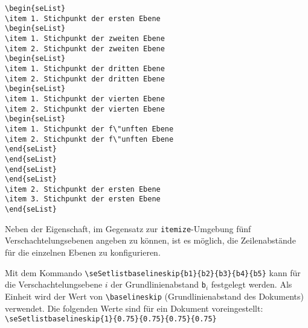 \vspace*{-\baselineskip}
\begin{verbatim}
\begin{seList}
\item 1. Stichpunkt der ersten Ebene
\begin{seList}
\item 1. Stichpunkt der zweiten Ebene
\item 2. Stichpunkt der zweiten Ebene
\begin{seList}
\item 1. Stichpunkt der dritten Ebene
\item 2. Stichpunkt der dritten Ebene
\begin{seList}
\item 1. Stichpunkt der vierten Ebene
\item 2. Stichpunkt der vierten Ebene
\begin{seList}
\item 1. Stichpunkt der f\"unften Ebene
\item 2. Stichpunkt der f\"unften Ebene
\end{seList}
\end{seList}
\end{seList}
\end{seList}
\item 2. Stichpunkt der ersten Ebene
\item 3. Stichpunkt der ersten Ebene
\end{seList}
\end{verbatim}

\vspace*{-\baselineskip}
Neben der Eigenschaft, im Gegensatz zur \verb+itemize+-Umgebung f\"unf Verschachtelungsebenen angeben zu k\"onnen, ist es m\"oglich,
die Zeilenabst\"ande f\"ur die einzelnen Ebenen zu konfigurieren. 

Mit dem Kommando \newline 
\hspace*{\fill}\verb+\seSetlistbaselineskip{b1}{b2}{b3}{b4}{b5}+\hspace*{\fill}\newline 
kann f\"ur die Verschachtelungsebene $i$ der Grundlinienabstand \texttt{b$_{i}$} festgelegt 
werden. Als Einheit wird der Wert von \verb+\baselineskip+ (Grundlinienabstand des Dokuments) verwendet. Die folgenden Werte sind f\"ur ein Dokument voreingestellt:\newline
\hspace*{\fill}\verb+\seSetlistbaselineskip{1}{0.75}{0.75}{0.75}{0.75}+\hspace*{\fill}\newline\vspace*{-\baselineskip}

